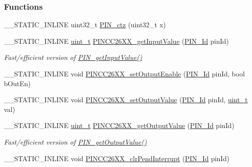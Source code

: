 \subsubsection*{Functions}
\begin{DoxyCompactItemize}
\item 
\-\_\-\-\_\-\-S\-T\-A\-T\-I\-C\-\_\-\-I\-N\-L\-I\-N\-E uint32\-\_\-t \hyperlink{_p_i_n_c_c26_x_x_8h_a94ac62e1f4e034d392ef5827bb2ab763}{P\-I\-N\-\_\-ctz} (uint32\-\_\-t x)
\item 
\-\_\-\-\_\-\-S\-T\-A\-T\-I\-C\-\_\-\-I\-N\-L\-I\-N\-E \hyperlink{_p_i_n_8h_a12a1e9b3ce141648783a82445d02b58d}{uint\-\_\-t} \hyperlink{_p_i_n_c_c26_x_x_8h_a08ed2ad0cefced9fb2224edf5a040be5}{P\-I\-N\-C\-C26\-X\-X\-\_\-get\-Input\-Value} (\hyperlink{_p_i_n_8h_a9ae8197f460bb76ea09a84f47d09921f}{P\-I\-N\-\_\-\-Id} pin\-Id)
\begin{DoxyCompactList}\small\item\em Fast/efficient version of \hyperlink{_p_i_n_8h_a9bfcc2ddeaaac6dcd90d31ff0c125f3d}{P\-I\-N\-\_\-get\-Input\-Value()} \end{DoxyCompactList}\item 
\-\_\-\-\_\-\-S\-T\-A\-T\-I\-C\-\_\-\-I\-N\-L\-I\-N\-E void \hyperlink{_p_i_n_c_c26_x_x_8h_acd27e505982c7ece583d405d6d9f6027}{P\-I\-N\-C\-C26\-X\-X\-\_\-set\-Output\-Enable} (\hyperlink{_p_i_n_8h_a9ae8197f460bb76ea09a84f47d09921f}{P\-I\-N\-\_\-\-Id} pin\-Id, bool b\-Out\-En)
\item 
\-\_\-\-\_\-\-S\-T\-A\-T\-I\-C\-\_\-\-I\-N\-L\-I\-N\-E void \hyperlink{_p_i_n_c_c26_x_x_8h_a97732e0803b68d0094930bfcc04e53c6}{P\-I\-N\-C\-C26\-X\-X\-\_\-set\-Output\-Value} (\hyperlink{_p_i_n_8h_a9ae8197f460bb76ea09a84f47d09921f}{P\-I\-N\-\_\-\-Id} pin\-Id, \hyperlink{_p_i_n_8h_a12a1e9b3ce141648783a82445d02b58d}{uint\-\_\-t} val)
\item 
\-\_\-\-\_\-\-S\-T\-A\-T\-I\-C\-\_\-\-I\-N\-L\-I\-N\-E \hyperlink{_p_i_n_8h_a12a1e9b3ce141648783a82445d02b58d}{uint\-\_\-t} \hyperlink{_p_i_n_c_c26_x_x_8h_a487a8fe91cce4d7121897be4fb6534cf}{P\-I\-N\-C\-C26\-X\-X\-\_\-get\-Output\-Value} (\hyperlink{_p_i_n_8h_a9ae8197f460bb76ea09a84f47d09921f}{P\-I\-N\-\_\-\-Id} pin\-Id)
\begin{DoxyCompactList}\small\item\em Fast/efficient version of \hyperlink{_p_i_n_8h_a4a05603f0e075a37af59ed66fd6c6443}{P\-I\-N\-\_\-get\-Output\-Value()} \end{DoxyCompactList}\item 
\-\_\-\-\_\-\-S\-T\-A\-T\-I\-C\-\_\-\-I\-N\-L\-I\-N\-E void \hyperlink{_p_i_n_c_c26_x_x_8h_a9e8be001ff8ca9946dce5668685befae}{P\-I\-N\-C\-C26\-X\-X\-\_\-clr\-Pend\-Interrupt} (\hyperlink{_p_i_n_8h_a9ae8197f460bb76ea09a84f47d09921f}{P\-I\-N\-\_\-\-Id} pin\-Id)

\end{DoxyCompactItemize}
